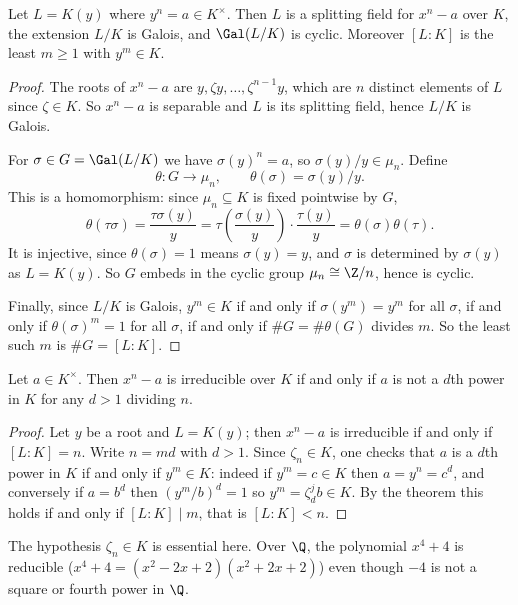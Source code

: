 \begin{theorem}\label{thm:kummer1}
	Let $L = K(y)$ where $y^n = a \in K^\times$. Then $L$ is a splitting field for $x^n-a$ over $K$, the extension $L/K$ is Galois, and $\Gal(L/K)$ is cyclic. Moreover $[L:K]$ is the least $m \geq 1$ with $y^m \in K$.
\end{theorem}

\begin{proof}
	The roots of $x^n - a$ are $y, \zeta y, \dots, \zeta^{n-1}y$, which are $n$ distinct elements of $L$ since $\zeta \in K$. So $x^n-a$ is separable and $L$ is its splitting field, hence $L/K$ is Galois.

	For $\sigma \in G = \Gal(L/K)$ we have $\sigma(y)^n = a$, so $\sigma(y)/y \in \mu_n$. Define
	$$\theta : G \to \mu_n, \qquad \theta(\sigma) = \sigma(y)/y.$$
	This is a homomorphism: since $\mu_n \subseteq K$ is fixed pointwise by $G$,
	$$\theta(\tau\sigma) = \frac{\tau\sigma(y)}{y} = \tau\!\left(\frac{\sigma(y)}{y}\right)\cdot\frac{\tau(y)}{y} = \theta(\sigma)\theta(\tau).$$
	It is injective, since $\theta(\sigma) = 1$ means $\sigma(y) = y$, and $\sigma$ is determined by $\sigma(y)$ as $L = K(y)$. So $G$ embeds in the cyclic group $\mu_n \cong \Z/n$, hence is cyclic.

	Finally, since $L/K$ is Galois, $y^m \in K$ if and only if $\sigma(y^m) = y^m$ for all $\sigma$, if and only if $\theta(\sigma)^m = 1$ for all $\sigma$, if and only if $\#G = \#\theta(G)$ divides $m$. So the least such $m$ is $\#G = [L:K]$.
\end{proof}

\begin{corollary}\label{cor:xnairred}
	Let $a \in K^\times$. Then $x^n - a$ is irreducible over $K$ if and only if $a$ is not a $d$th power in $K$ for any $d > 1$ dividing $n$.
\end{corollary}

\begin{proof}
	Let $y$ be a root and $L = K(y)$; then $x^n-a$ is irreducible if and only if $[L:K] = n$. Write $n = md$ with $d > 1$. Since $\zeta_n \in K$, one checks that $a$ is a $d$th power in $K$ if and only if $y^m \in K$: indeed if $y^m = c \in K$ then $a = y^n = c^d$, and conversely if $a = b^d$ then $(y^m/b)^d = 1$ so $y^m = \zeta_d^j b \in K$. By the theorem this holds if and only if $[L:K] \mid m$, that is $[L:K] < n$.
\end{proof}

\begin{remark}
	The hypothesis $\zeta_n \in K$ is essential here. Over $\Q$, the polynomial $x^4+4$ is reducible ($x^4+4 = (x^2-2x+2)(x^2+2x+2)$) even though $-4$ is not a square or fourth power in $\Q$.
\end{remark}


